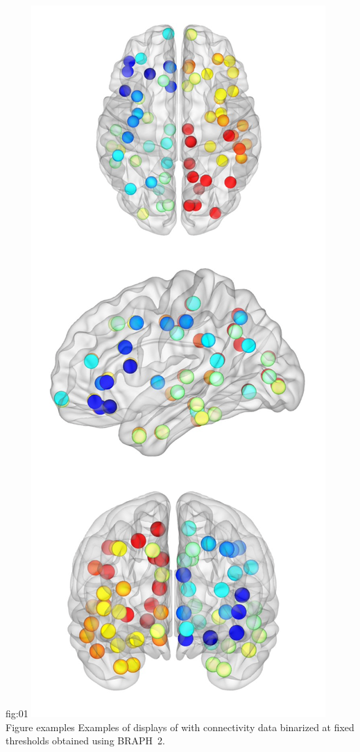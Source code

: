 \documentclass[justified]{tufte-handout}
\begin{document}
{fig:01}
{\includegraphics{fig01.png}}
{Figure examples}
{
	Examples of displays of  with connectivity data binarized at fixed thresholds obtained using BRAPH~2.
}
\end{document}
